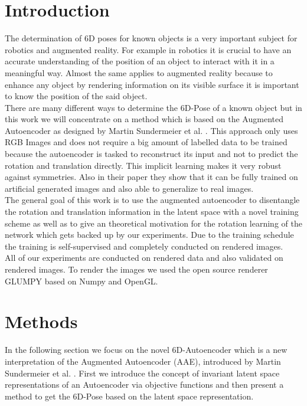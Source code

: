 \documentclass[10pt,a4paper]{article}
\begin{document}
\section{Introduction}\label{Introduction}
The determination of 6D poses for known objects is a very important subject for robotics and augmented reality. For example in robotics it is crucial to have an accurate understanding of the position of an object to interact with it in a meaningful way. Almost the same applies to augmented reality because to enhance any object by rendering information on its visible surface it is important to know the position of the said object.\\
There are many different ways to determine the 6D-Pose of a known object but in this work we will concentrate on a method which is based on the Augmented Autoencoder as designed by Martin Sundermeier et al. \cite{3D_Orientation_Learning}. This approach only uses RGB Images and does not require a big amount of labelled data to be trained because the autoencoder is tasked to reconstruct its input and not to predict the rotation and translation directly. This implicit learning makes it very robust against symmetries. Also in their paper they show that it can be fully trained on artificial generated images and also able to generalize to real images.\\
The general goal of this work is to use the augmented autoencoder to disentangle the rotation and translation information in the latent space with a novel training scheme as well as to give an theoretical motivation for the rotation learning of the network which gets backed up by our experiments. Due to the training schedule the training is self-supervised and completely conducted on rendered images.\\
All of our experiments are conducted on rendered data and also validated on rendered images. To render the images we used the open source renderer GLUMPY \cite{GLUMPY} based on Numpy and OpenGL. \\  




\newpage

\section{Methods}\label{Methods}
In the following section we focus on the novel 6D-Autoencoder which is a new interpretation of the Augmented Autoencoder (AAE), introduced by Martin Sundermeier et al. \cite{3D_Orientation_Learning}. First we introduce the concept of invariant latent space representations of an Autoencoder via objective functions and then present a method to get the 6D-Pose based on the latent space representation.
\end{document}
